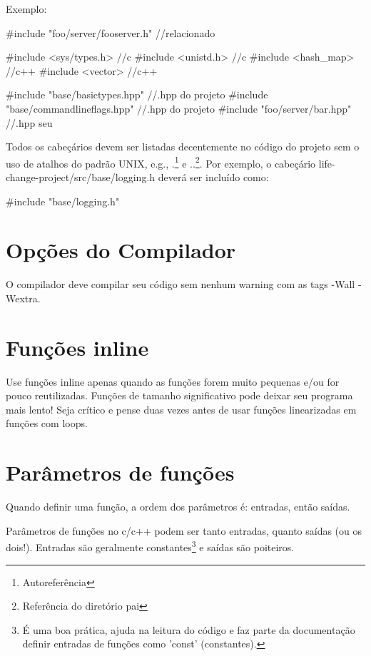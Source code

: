 \documentclass{article}
\begin{document}
Exemplo:
\begin{code}
#include "foo/server/fooserver.h" //relacionado

#include <sys/types.h> //c
#include <unistd.h> //c
#include <hash_map> //c++
#include <vector> //c++

#include "base/basictypes.hpp" //.hpp do projeto
#include "base/commandlineflags.hpp" //.hpp do projeto
#include "foo/server/bar.hpp" //.hpp seu
\end{code}

Todos os cabeçários devem ser listadas decentemente no código do projeto sem o uso de atalhos do padrão UNIX, e.g., .\footnote{Autoreferência} e ..\footnote{Referência do diretório pai}. Por exemplo, o cabeçário life-change-project/src/base/logging.h deverá ser incluído como:

\begin{code}
#include "base/logging.h"
\end{code}

\section{Opções do Compilador}

O compilador deve compilar seu código sem nenhum warning com as tags -Wall -Wextra.

\section{Funções inline}

Use funções inline apenas quando as funções forem muito pequenas e/ou for pouco reutilizadas. Funções de tamanho significativo pode deixar seu programa mais lento! Seja crítico e pense duas vezes antes de usar funções linearizadas em funções com loops.

\section{Parâmetros de funções}

Quando definir uma função, a ordem dos parâmetros é: entradas, então saídas.

Parâmetros de funções no c/c++ podem ser tanto entradas, quanto saídas (ou os dois!). Entradas são geralmente constantes\footnote{É uma boa prática, ajuda na leitura do código e faz parte da documentação definir entradas de funções como 'const' (constantes).} e saídas são poiteiros. 
\end{document}
